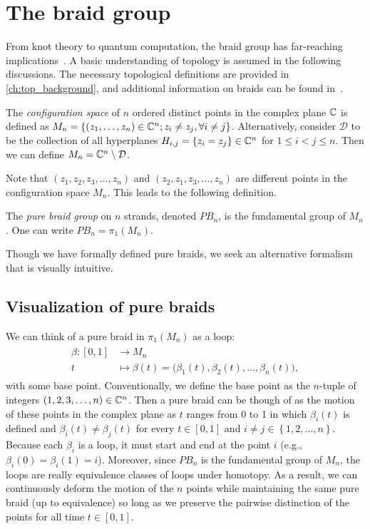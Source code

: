 \chapter{The braid group}\label{ch:braid_group}


From knot theory to quantum computation, the braid group has far-reaching implications~\cite{Artin1947,Date2003,Delaney2016,Deshmukh,Kassel2008,Khare2005}. A basic understanding of topology is assumed in the following discussions. The necessary topological definitions are provided in \cref{ch:top_background}, and additional information on braids can be found in~\cite{Artin1947,Kassel2008,Gonzalez2010,Rolfsen2010,Fulton1997}.
\begin{definition}
    The \textit{configuration space} of $n$ ordered distinct points in the complex plane $\mathbb{C}$ is defined as $M_n = \left\{ \left( z_1,\dots,z_n \right)\in\mathbb{C}^n ; z_i\neq z_j,\forall i\neq j \right\}$. Alternatively, consider $\mathcal{D}$ to be the collection of all hyperplanes $H_{i,j}=\left\{ z_i=z_j \right\}\in\mathbb{C}^n$ for $1\leq i < j \leq n$. Then we can define $M_n = \mathbb{C}^n \setminus \mathcal{D}$.
\end{definition}
Note that $\left( z_1,z_2,z_3,\dots,z_n \right)$ and $\left( z_2,z_1,z_3,\dots,z_n \right)$ are different points in the configuration space $M_n$. This leads to the following definition.
\begin{definition}
    The \textit{pure braid group} on $n$ strands, denoted $PB_n$, is the fundamental group of $M_n$. One can write $PB_n = \pi_1(M_n)$.
\end{definition}
Though we have formally defined pure braids, we seek an alternative formalism that is visually intuitive.

\section{Visualization of pure braids}

We can think of a pure braid in $\pi_1(M_n)$ as a loop:
\begin{align}
    \begin{split}
    \beta : \left[ 0,1 \right] &\to M_n \\
    t &\mapsto \beta(t) = \bigl( \beta_1(t),\beta_2(t),\dots,\beta_n(t) \bigr),
    \end{split}
\end{align}
with some base point. Conventionally, we define the base point as the $n$-tuple of integers $(1,2,3,\dots,n)\in \mathbb{C}^n$. Then a pure braid can be though of as the motion of these points in the complex plane as $t$ ranges from 0 to 1 in which $\beta_i(t)$ is defined and $\beta_i(t)\neq \beta_j(t)$ for every $t\in[0,1]$ and $i\neq j\in\left\{ 1,2,\dots,n \right\}$. Because each $\beta_i$ is a loop, it must start and end at the point $i$ (e.g., $\beta_i(0)=\beta_i(1)=i$). Moreover, since $PB_n$ is the fundamental group of $M_n$, the loops are really equivalence classes of loops under homotopy. As a result, we can continuously deform the motion of the $n$ points while maintaining the same pure braid (up to equivalence) so long as we preserve the pairwise distinction of the points for all time $t\in[0,1]$.

